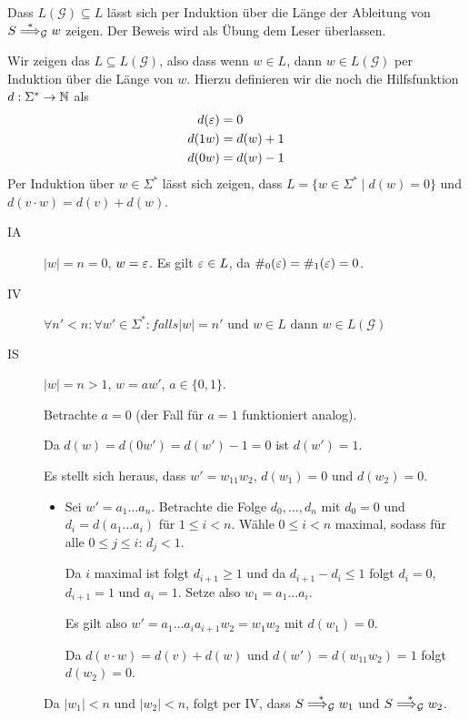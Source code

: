 {\begin{itemize}
  Dass $L(\mathcal{G}) \subseteq L$ lässt sich per Induktion über die Länge der Ableitung von $S \stackrel{*}{\==>}_\mathcal{G} w$ zeigen.
  Der Beweis wird als Übung dem Leser überlassen.

  Wir zeigen das $L \subseteq L(\mathcal{G})$, also dass wenn $w \in L$, dann $w \in L(\mathcal{G})$ per Induktion über die Länge von $w$.
  Hierzu definieren wir die noch die Hilfsfunktion $d : \Sigma^* \to \mathbb{N}$ als
  \begin{align*}
    d(\varepsilon) &= 0 \\
    d(1w) &= d(w) + 1 \\
    d(0w) &= d(w) - 1
  \end{align*}
  Per Induktion über $w \in \Sigma^*$ lässt sich zeigen, dass $L = \{w \in \Sigma^* \mid d(w) = 0\}$ und $d(v \cdot w) = d(v) + d(w)$.
\begin{description}
\item[IA] $|w| = n = 0$, $w = \varepsilon$. Es gilt $\varepsilon \in L$, da $\#_0(\varepsilon) = \#_1(\varepsilon) = 0$.
\item[IV] $\forall n' < n: \forall w' \in \Sigma^*: falls |w| = n' \text{ und } w \in L \text{ dann } w \in L(\mathcal{G})$
\item[IS] $|w| = n > 1$, $w = aw'$, $a \in \{0,1\}$.

  Betrachte $a = 0$ (der Fall für $a = 1$ funktioniert analog).

  Da $d(w) = d(0w') = d(w') - 1 = 0$ ist $d(w') = 1$.

  Es stellt sich heraus, dass $w' = w_11w_2$, $d(w_1) = 0$ und $d(w_2) = 0$.
  \begin{itemize}
  \item[] 
    Sei $w' = a_1 \ldots a_n$.
    Betrachte die Folge $d_0,\ldots,d_n$ mit $d_0 = 0$ und $d_i = d(a_1\ldots a_i)$ für $1 \le i < n$.
    Wähle $0 \le i < n$ maximal, sodass für alle $0 \le j \le i$: $d_j < 1$.

    Da $i$ maximal ist folgt $d_{i+1} \ge 1$ und da $d_{i+1} - d_i \le 1$  folgt $d_i = 0$, $d_{i+1} = 1$ und $a_i = 1$.
    Setze also $w_1 = a_1\ldots a_{i}$.

    Es gilt also $w' = a_1\ldots a_{i}a_{i+1}w_2 = w_1w_2$ mit $d(w_1) = 0$.

    Da $d(v \cdot w) = d(v) + d(w)$ und $d(w') = d(w_11w_2) = 1$ folgt $d(w_2) = 0$.
  \end{itemize}

  Da $|w_1| < n$ und $|w_2| < n$, folgt per IV, dass $S \stackrel{*}{ \==>_{\mathcal{G}} } w_1$ und $S \stackrel{*}{\==>_{\mathcal{G}}} w_2$.


\end{description}
\end{itemize}}
